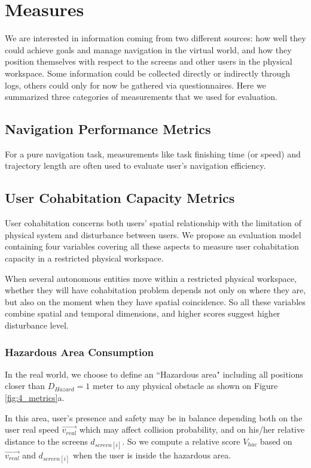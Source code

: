 \section{Measures}
We are interested in information coming from two different sources: how well they could achieve goals and manage navigation in the virtual world, and how they position themselves with respect to the screens and other users in the physical workspace. Some information could be collected directly or indirectly through logs, others could only for now be gathered via questionnaires. Here we summarized three categories of measurements that we used for evaluation.

\subsection{Navigation Performance Metrics}
For a pure navigation task, measurements like task finishing time (or speed) and trajectory length are often used to evaluate user's navigation efficiency.

\subsection{User Cohabitation Capacity Metrics}
User cohabitation concerns both users' spatial relationship with the limitation of physical system and disturbance between users. We propose an evaluation model containing four variables covering all these aspects to measure user cohabitation capacity in a restricted physical workspace.

When several autonomous entities move within a restricted physical workspace, whether they will have cohabitation problem depends not only on where they are, but also on the moment when they have spatial coincidence. So all these variables combine spatial and temporal dimensions, and higher scores suggest higher disturbance level.

\subsubsection{Hazardous Area Consumption}
In the real world, we choose to define an ``Hazardous area" including all positions closer than $D_{Hazard}=1$ meter to any physical obstacle as shown on Figure \ref{fig:4_metrics}a.

In this area, user's presence and safety may be in balance depending both on the user real speed $\overrightarrow{v_{real}}$ which may affect collision probability, and on his/her relative distance to the screens $d_{screen[i]}$. So we compute a relative score $V_{hac}$ based on $\overrightarrow{v_{real}}$ and $d_{screen[i]}$ when the user is inside the hazardous area. 

